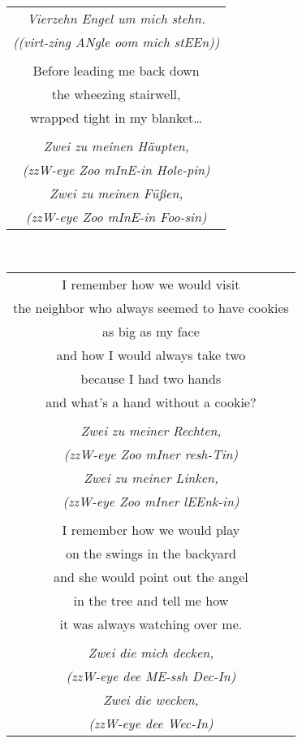 \documentclass{article}
\begin{document}
\begin{center}
\begin{tabular}{c}
\textit{Vierzehn Engel um mich stehn.} \\
{\scriptsize\textit{((virt-zing ANgle oom mich stEEn))}} \\
\\
Before leading me back down \\
the wheezing stairwell, \\
wrapped tight in my blanket\ldots{} \\
\\
\textit{Zwei zu meinen H{\"a}upten,} \\
{\scriptsize\textit{(zzW-eye Zoo mInE-in Hole-pin)}} \\
\textit{Zwei zu meinen F{\"u}{\ss}en,} \\
{\scriptsize\textit{(zzW-eye Zoo mInE-in Foo-sin)}} \\
\end{tabular}\\
\begin{tabular}{c}
\\
I remember how we would visit \\
the neighbor who always seemed to have cookies \\
as big as my face \\
and how I would always take two \\
because I had two hands \\
and what's a hand without a cookie? \\
\\
\textit{Zwei zu meiner Rechten,} \\
{\scriptsize\textit{(zzW-eye Zoo mIner resh-Tin)}} \\
\textit{Zwei zu meiner Linken,} \\
{\scriptsize\textit{(zzW-eye Zoo mIner lEEnk-in)}} \\
\\
I remember how we would play \\
on the swings in the backyard \\
and she would point out the angel \\
in the tree and tell me how \\
it was always watching over me. \\
\\
\textit{Zwei die mich decken,} \\
{\scriptsize\textit{(zzW-eye dee ME-ssh Dec-In)}} \\
\textit{Zwei die wecken,} \\
{\scriptsize\textit{(zzW-eye dee Wec-In)}} \\

\end{tabular}
\end{center}
\end{document}

